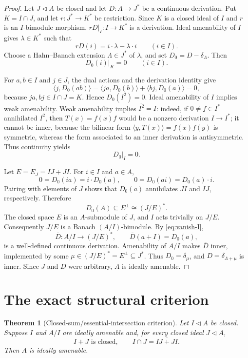 \documentclass[11pt]{article}
\newtheorem{theorem}{Theorem}
\newcommand{\cl}{\overline}
\begin{document}
\begin{proof}
Let $J\triangleleft A$ be closed and let $D:A\to J^*$ be a continuous
derivation.  Put $K=I\cap J$, and let
$r:J^*\to K^*$ be restriction.  Since $K$ is a closed ideal of $I$ and $r$
is an $I$-bimodule morphism, $rD|_I:I\to K^*$ is a derivation.  Ideal
amenability of $I$ gives $\lambda\in K^*$ such that
\[
 rD(i)=i\cdot\lambda-\lambda\cdot i \qquad(i\in I).
\]
Choose a Hahn--Banach extension $\Lambda\in J^*$ of $\lambda$, and set
$D_0=D-\delta_\Lambda$.  Then
\begin{equation}\label{eq:restricted}
 D_0(i)|_K=0 \qquad(i\in I).
\end{equation}

For $a,b\in I$ and $j\in J$, the dual actions and the derivation identity
give
\[
 \langle j,D_0(ab)\rangle
 =\langle ja,D_0(b)\rangle+\langle bj,D_0(a)\rangle=0,
\]
because $ja,bj\in I\cap J=K$.  Hence $D_0(I^2)=0$.  Ideal amenability of
$I$ implies weak amenability.  Weak amenability implies
$\cl{I^2}=I$: indeed, if $0\ne f\in I^*$ annihilated $I^2$, then
$T(x)=f(x)f$ would be a nonzero derivation $I\to I^*$; it cannot be inner,
because the bilinear form $\langle y,T(x)\rangle=f(x)f(y)$ is symmetric,
whereas the form associated to an inner derivation is antisymmetric.
Thus continuity yields
\begin{equation}\label{eq:vanish-I}
 D_0|_I=0.
\end{equation}

Let $E=E_J=\cl{IJ+JI}$.  For $i\in I$ and $a\in A$,
\[
 0=D_0(ia)=i\cdot D_0(a),
 \qquad
 0=D_0(ai)=D_0(a)\cdot i.
\]
Pairing with elements of $J$ shows that $D_0(a)$ annihilates $JI$ and
$IJ$, respectively.  Therefore
\[
 D_0(A)\subseteq E^\perp\cong (J/E)^*.
\]
The closed space $E$ is an $A$-submodule of $J$, and $I$ acts trivially on
$J/E$.  Consequently $J/E$ is a Banach $(A/I)$-bimodule.  By
\eqref{eq:vanish-I},
\[
 \bar D:A/I\longrightarrow (J/E)^*,\qquad
 \bar D(a+I)=D_0(a),
\]
is a well-defined continuous derivation.  Amenability of $A/I$ makes
$\bar D$ inner, implemented by some $\mu\in (J/E)^*=E^\perp\subseteq J^*$.
Thus $D_0=\delta_\mu$, and
$D=\delta_{\Lambda+\mu}$ is inner.  Since $J$ and $D$ were arbitrary, $A$
is ideally amenable.
\end{proof}

\section{The exact structural criterion}
\begin{theorem}[Closed-sum/essential-intersection criterion]\label{thm:criterion}
Let $I\triangleleft A$ be closed.  Suppose $I$ and $A/I$ are ideally
amenable and, for every closed ideal $J\triangleleft A$,
\begin{equation}\label{eq:structural}
 I+J\text{ is closed},
 \qquad
 I\cap J=\cl{IJ+JI}.
\end{equation}
Then $A$ is ideally amenable.
\end{theorem}
\end{document}
